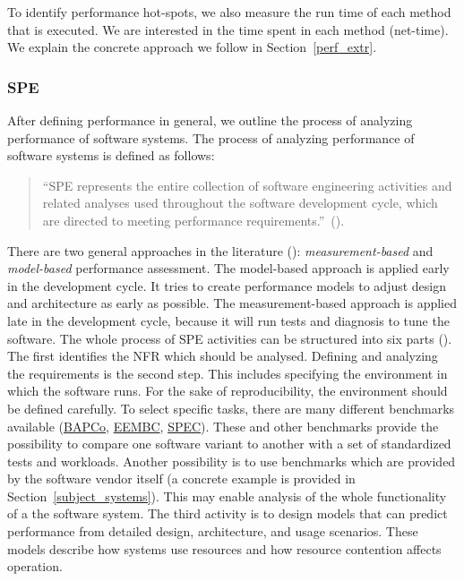 To identify performance hot-spots, we also measure the run time of each method that is executed.
We are interested in the time spent in each method (net-time).
We explain the concrete approach we follow in Section~\ref{perf_extr}. 


\subsubsection{\ac{SPE}}

After defining performance in general, we outline the process of analyzing performance of software systems.
The process of analyzing performance of software systems is defined as follows:
\begin{quote}
``\ac{SPE} represents the entire collection of software engineering activities and related analyses used throughout the software development cycle, which are directed to meeting performance requirements.''~(\cite{woodside2007future}).
\end{quote}
There are two general approaches in the literature (\cite{woodside2007future}): \textit{measurement-based} and \textit{model-based} performance assessment. 
The model-based approach is applied early in the development cycle. 
It tries to create performance models to adjust design and architecture as early as possible. 
The measurement-based approach is applied late in the development cycle, because it will run tests and diagnosis to tune the software.
The whole process of \ac{SPE} activities can be structured into six parts (\cite{woodside2007future}). 
The first identifies the \ac{NFR} which should be analysed.
Defining and analyzing the requirements is the second step. 
This includes specifying the environment in which the software runs. 
For the sake of reproducibility, the environment should be defined carefully.  
To select specific tasks, there are many different benchmarks available (\href{https://bapco.com/}{BAPCo}, \href{https://www.eembc.org/}{EEMBC}, \href{http://www.spec.org/}{SPEC}). 
These and other benchmarks provide the possibility to compare one software variant to another with a set of standardized tests and workloads. 
Another possibility is to use benchmarks which are provided by the software vendor itself (a concrete example is provided in Section~\ref{subject_systems}). 
This may enable analysis of the whole functionality of a the software system.
The third activity is to design models that can predict performance from detailed design, architecture, and usage scenarios. 
These models describe how systems use resources and how resource contention affects operation. 
